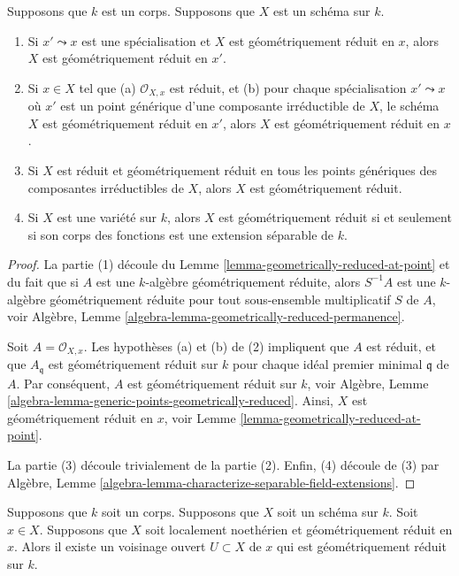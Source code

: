 \begin{lemma}
\label{lemma-generic-points-geometrically-reduced}
Supposons que $k$ est un corps.
Supposons que $X$ est un schéma sur $k$.
\begin{enumerate}
\item Si $x' \leadsto x$ est une spécialisation et $X$
est géométriquement réduit en $x$, alors $X$ est
géométriquement réduit en $x'$. \item Si $x \in X$ tel
que (a) $\mathcal{O}_{X, x}$ est réduit, et (b) pour
chaque spécialisation $x' \leadsto x$ où $x'$ est un
point générique d'une composante irréductible de $X$, le
schéma $X$ est géométriquement réduit en $x'$, alors $X$
est géométriquement réduit en $x$. \item Si $X$ est
réduit et géométriquement réduit en tous les points
génériques des composantes irréductibles de $X$, alors $X$
est géométriquement réduit. \item Si $X$ est une variété sur
$k$, alors $X$ est géométriquement réduit si et seulement si
son corps des fonctions est une extension séparable de $k$.
\end{enumerate}
\end{lemma}

\begin{proof}
La partie (1) découle du Lemme
\ref{lemma-geometrically-reduced-at-point} et du fait que
si $A$ est une $k$-algèbre géométriquement réduite, alors
$S^{-1}A$ est une $k$-algèbre géométriquement réduite pour
tout sous-ensemble multiplicatif $S$ de $A$, voir Algèbre,
Lemme \ref{algebra-lemma-geometrically-reduced-permanence}.

\medskip\noindent
Soit $A = \mathcal{O}_{X, x}$. Les hypothèses (a) et (b) de (2)
impliquent que $A$ est réduit, et que $A_{\mathfrak q}$ est
géométriquement réduit sur $k$ pour chaque idéal premier minimal
$\mathfrak q$ de $A$. Par conséquent, $A$ est géométriquement
réduit sur $k$, voir Algèbre, Lemme
\ref{algebra-lemma-generic-points-geometrically-reduced}. Ainsi, $X$ est
géométriquement réduit en $x$, voir Lemme \ref{lemma-geometrically-reduced-at-point}.

\medskip\noindent
La partie (3) découle trivialement de la partie (2).
Enfin, (4) découle de (3) par Algèbre, Lemme
\ref{algebra-lemma-characterize-separable-field-extensions}.
\end{proof}

\begin{lemma}
\label{lemma-Noetherian-geometrically-reduced-at-point}
Supposons que $k$ soit un corps. Supposons
que $X$ soit un schéma sur $k$. Soit $x \in
X$. Supposons que $X$ soit localement
noethérien et géométriquement réduit en $x$.
Alors il existe un voisinage ouvert $U \subset
X$ de $x$ qui est géométriquement réduit sur $k$.
\end{lemma}

